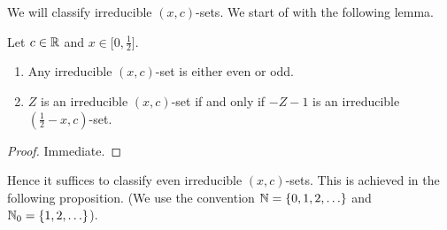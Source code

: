 We will classify irreducible $(x,c)$-sets. We start of with the following lemma.

\begin{Lem} Let $c\in\mathbb{R}$ and $x\in \lbrack 0,\frac{1}{2}\rbrack$.
\begin{enumerate} \item Any irreducible $(x,c)$-set is either even or odd.
\item $Z$ is an irreducible $(x,c)$-set if and only if $-Z-1$ is an irreducible $(\frac{1}{2}-x,c)$-set.
\end{enumerate}
\end{Lem}

\begin{proof} Immediate.
\end{proof}

Hence it suffices to classify even irreducible $(x,c)$-sets. This is achieved in the following proposition. (We use the convention $\mathbb{N} = \{0,1,2,\ldots\}$ and $\mathbb{N}_0=\{1,2,\ldots\}$).

